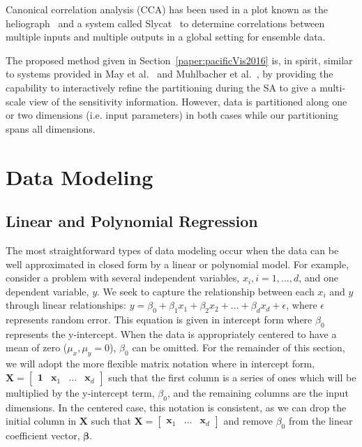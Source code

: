 Canonical correlation analysis (CCA) has been used in a plot known as the heliograph~\cite{DeganiShaftoOlson2006} and a system called Slycat~\cite{CrossnoSheadSielicki2015} to determine correlations between multiple inputs and multiple outputs in a global setting for ensemble data.

The proposed method given in Section~\ref{paper:pacificVis2016} is, in spirit, similar to systems provided in May et al.~\cite{MayBannachDavey2011} and Muhlbacher et al.~\cite{MuhlbacherPiringer2013}, by providing the capability to interactively refine the partitioning during the SA to give a multi-scale view of the sensitivity information.
%
However, data is partitioned along one or two dimensions (i.e. input parameters) in both cases while our partitioning spans all dimensions.

\section{Data Modeling}
\label{sec:regression}
\subsection{Linear and Polynomial Regression}
The most straightforward types of data modeling occur when the data can be well approximated in closed form by a linear or polynomial model.
%
For example, consider a problem with several independent variables, $x_i, i=1,...,d$, and one dependent variable, $y$.
%
We seek to capture the relationship between each $x_i$ and $y$ through linear relationships: $y = \beta_0 + \beta_1 x_1 + \beta_2 x_2 + ... + \beta_d x_d + \epsilon$, where $\epsilon$ represents random error.
%
This equation is given in intercept form where $\beta_0$ represents the y-intercept.
%
When the data is appropriately centered to have a mean of zero ($\mu_x,\mu_y = 0$), $\beta_0$ can be omitted.
%
For the remainder of this section, we will adopt the more flexible matrix notation where in intercept form, $\textbf{X} = \begin{bmatrix}\textbf{1} & \textbf{x}_1 & \ldots & \textbf{x}_d \end{bmatrix}$ such that the first column is a series of ones which will be multiplied by the y-intercept term, $\beta_0$, and the remaining columns are the input dimensions.
%
In the centered case, this notation is consistent, as we can drop the initial column in $\textbf{X}$ such that $\textbf{X} = \begin{bmatrix}\textbf{x}_1 & \ldots & \textbf{x}_d\end{bmatrix}$ and remove $\beta_0$ from the linear coefficient vector, $\boldsymbol\beta$.

